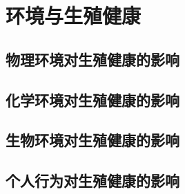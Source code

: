\chapter{环境与生殖健康}

\section{物理环境对生殖健康的影响}

\section{化学环境对生殖健康的影响}

\section{生物环境对生殖健康的影响}

\section{个人行为对生殖健康的影响}